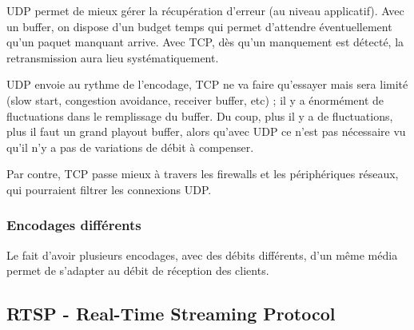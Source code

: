 			
			
		
			UDP permet de mieux gérer la récupération d'erreur (au niveau applicatif). Avec un buffer, on dispose d'un budget temps qui permet d'attendre éventuellement qu'un paquet manquant arrive. Avec TCP, dès qu'un manquement est détecté, la retransmission aura lieu systématiquement.
		
			UDP envoie au rythme de l'encodage, TCP ne va faire qu'essayer mais sera limité (slow start, congestion avoidance, receiver buffer, etc) ; il y a énormément de fluctuations dans le remplissage du buffer. Du coup, plus il y a de fluctuations, plus il faut un grand playout buffer, alors qu'avec UDP ce n'est pas nécessaire vu qu'il n'y a pas de variations de débit à compenser.
		
			Par contre, TCP passe mieux à travers les firewalls et les périphériques réseaux, qui pourraient filtrer les connexions UDP.
			
			\subsubsection{Encodages différents}
			
			Le fait d'avoir plusieurs encodages, avec des débits différents, d'un même média permet de s'adapter au débit de réception des clients.
		
		
		\subsection{RTSP - Real-Time Streaming Protocol}
		
